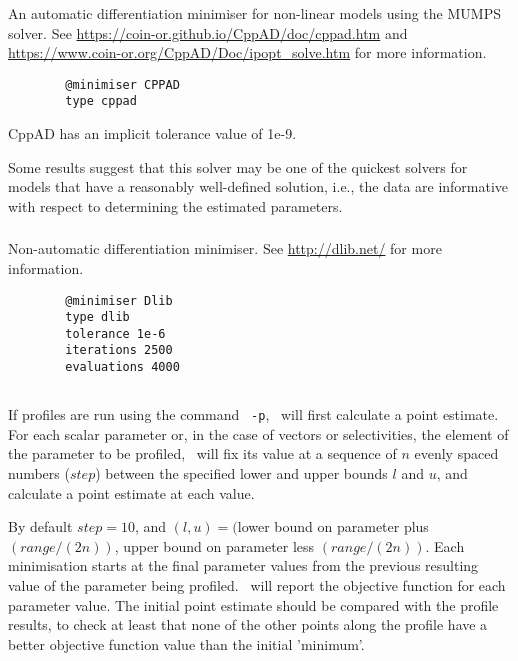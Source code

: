 \subsubsection{}

An automatic differentiation minimiser for non-linear models using the MUMPS solver. See \url{https://coin-or.github.io/CppAD/doc/cppad.htm} and \url{https://www.coin-or.org/CppAD/Doc/ipopt_solve.htm} for more information.

{\small{\begin{verbatim}
		@minimiser CPPAD
		type cppad
		\end{verbatim}}}

CppAD has an implicit tolerance value of 1e-9.

Some results suggest that this solver may be one of the quickest solvers for models that have a reasonably well-defined solution, i.e., the data are informative with respect to determining the estimated parameters.

\subsubsection{}

Non-automatic differentiation minimiser. See \url{http://dlib.net/} for more information.

{\small{\begin{verbatim}
		@minimiser Dlib
		type dlib
		tolerance 1e-6
		iterations 2500
		evaluations 4000
		\end{verbatim}}}

\subsection{\label{sec:estimate-profiles}}

If profiles are run using the command \texttt{\cname\ -p}, \CNAME\ will first calculate a point estimate. For each scalar parameter or, in the case of vectors or selectivities, the element of the parameter to be profiled, \CNAME\ will fix its value at a sequence of $n$ evenly spaced numbers ($step$) between the specified lower and upper bounds $l$ and $u$, and calculate a point estimate at each value.

By default $step=10$, and $(l, u)=($lower bound on parameter plus $(range/(2n))$, upper bound on parameter less $(range/(2n))$. Each minimisation starts at the final parameter values from the previous resulting value of the parameter being profiled. \CNAME\ will report the objective function for each parameter value. The initial point estimate should be compared with the profile results, to check at least that none of the other points along the profile have a better objective function value than the initial 'minimum'.

